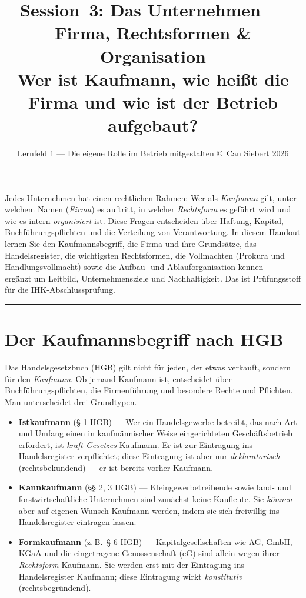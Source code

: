 \documentclass[11pt, a4paper]{article}
\title{\vspace*{-1.5cm}\Huge\bfseries\color{bfwPrimaryDark}Session~3: Das Unternehmen --- Firma, Rechtsformen \& Organisation\\[0.4em]
  \large\color{bfwInkSoft}\textnormal{Wer ist Kaufmann, wie heißt die Firma und wie ist der Betrieb aufgebaut?}}
\author{\textsf{Lernfeld 1 --- Die eigene Rolle im Betrieb mitgestalten \textperiodcentered{} \small\copyright\ Can Siebert\,\textperiodcentered\,2026}}
\date{}
\begin{document}
\maketitle
\thispagestyle{empty}

\vspace{1em}
\begin{merksatz}[title={\bfseries Worum geht es in dieser Session?}]
Jedes Unternehmen hat einen rechtlichen Rahmen: Wer als \emph{Kaufmann} gilt, unter
welchem Namen (\emph{Firma}) es auftritt, in welcher \emph{Rechtsform} es geführt wird
und wie es intern \emph{organisiert} ist. Diese Fragen entscheiden über Haftung, Kapital,
Buchführungspflichten und die Verteilung von Verantwortung. In diesem Handout lernen Sie
den Kaufmannsbegriff, die Firma und ihre Grundsätze, das Handelsregister, die wichtigsten
Rechtsformen, die Vollmachten (Prokura und Handlungsvollmacht) sowie die Aufbau- und
Ablauforganisation kennen --- ergänzt um Leitbild, Unternehmensziele und Nachhaltigkeit.
Das ist Prüfungsstoff für die IHK-Abschlussprüfung.
\end{merksatz}

\tableofcontents
\vspace{1em}
\hrule
\vspace{1em}

\section{Der Kaufmannsbegriff nach HGB}

Das Handelsgesetzbuch (HGB) gilt nicht für jeden, der etwas verkauft, sondern für den
\emph{Kaufmann}. Ob jemand Kaufmann ist, entscheidet über Buchführungspflichten, die
Firmenführung und besondere Rechte und Pflichten. Man unterscheidet drei Grundtypen.

\begin{itemize}
  \item \textbf{Istkaufmann} (§ 1 HGB) --- Wer ein Handelsgewerbe betreibt, das nach Art
    und Umfang einen in kaufmännischer Weise eingerichteten Geschäftsbetrieb erfordert,
    ist \emph{kraft Gesetzes} Kaufmann. Er ist zur Eintragung ins Handelsregister
    verpflichtet; diese Eintragung ist aber nur \emph{deklaratorisch} (rechts\-bekundend)
    --- er ist bereits vorher Kaufmann.
  \item \textbf{Kannkaufmann} (§§ 2, 3 HGB) --- Kleingewerbetreibende sowie land- und
    forstwirtschaftliche Unternehmen sind zunächst keine Kaufleute. Sie \emph{können}
    aber auf eigenen Wunsch Kaufmann werden, indem sie sich freiwillig ins Handelsregister
    eintragen lassen.
  \item \textbf{Formkaufmann} (z.\,B.\ § 6 HGB) --- Kapitalgesellschaften wie AG, GmbH,
    KGaA und die eingetragene Genossenschaft (eG) sind allein wegen ihrer \emph{Rechtsform}
    Kaufmann. Sie werden erst mit der Eintragung ins Handelsregister Kaufmann; diese
    Eintragung wirkt \emph{konstitutiv} (rechts\-begründend).
\end{itemize}
\end{document}
